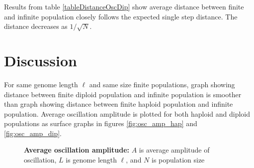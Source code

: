 Results from table \ref{tableDistanceOscDip} show average distance between finite and infinite population closely follows 
the expected single step distance. The distance decreases as $1/\sqrt{N}$.

\section{Discussion}
For same genome length $\ell$ and same size finite populations, graph showing distance between finite diploid population and infinite population is 
smoother than graph showing distance between finite haploid population and infinite population. Average oscillation amplitude is 
plotted for both haploid and diploid populations as surface graphs in figures \ref{fig:osc_amp_hap} and \ref{fig:osc_amp_dip}.

\begin{figure}[h]
\begin{center}
 \vspace{-0.5em} %

\caption[\textbf{Average oscillation amplitude}]{\textbf{Average oscillation amplitude:} $A$ is average amplitude of oscillation, $L$ is genome length $\ell$, and $N$ is population size}
\label{osc_amp}
\end{center}
\end{figure}

